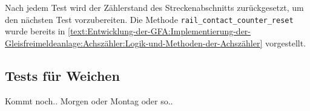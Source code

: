 Nach jedem Test wird der Zählerstand des Streckenabschnitts zurückgesetzt, um den nächsten Test vorzubereiten. Die Methode \texttt{rail\_contact\_counter\_reset} wurde bereits in \autoref{text:Entwicklung-der-GFA:Implementierung-der-Gleisfreimeldeanlage:Achszähler:Logik-und-Methoden-der-Achszähler}  vorgestellt.

\subsection{Tests für Weichen}\label{text:Entwicklung-der-GFA:Softwaretests:Tests-für-Weichen}

Kommt noch.. Morgen oder Montag oder so..